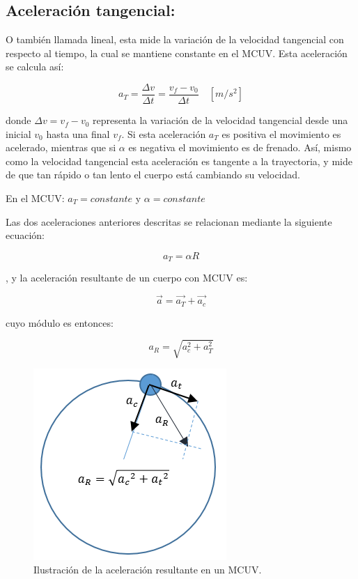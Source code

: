 \documentclass[a5paper,pagesize,10pt,bibtotoc,pointlessnumbers,
normalheadings,DIV=9,fleqn,x11names,table,twoside=false]{scrbook}
\begin{document}
\subsection{Aceleración tangencial:}

O también llamada lineal, esta mide la variación de la velocidad tangencial con respecto al tiempo, la cual se mantiene constante 
en el MCUV. Esta aceleración se calcula así:

\begin{equation}
a_T =\frac{\Delta v}{\Delta t} =\frac{v_f-v_0}{\Delta t}\quad [m/s^2]
\end{equation} 

donde $\Delta v = v_f-v_0$ representa la variación de la velocidad tangencial desde una inicial $v_0$ hasta una final $v_f$. Si 
esta aceleración $a_T$ es positiva el movimiento es acelerado, mientras que si $\alpha$ es negativa el movimiento es de frenado. 
Así, mismo como la velocidad tangencial esta aceleración es tangente a la trayectoria, y mide de que tan rápido o tan lento el 
cuerpo está cambiando su velocidad.

\begin{tcolorbox}
En el MCUV: $a_T = constante$ y $\alpha = constante$
\end{tcolorbox}

Las dos aceleraciones anteriores descritas se relacionan mediante la siguiente ecuación:

\begin{equation}
a_T = \alpha R
\end{equation} 

, y la aceleración resultante de un cuerpo con MCUV es:

\begin{equation}
\vec{a} = \vec{a_T}+\vec{a_c}
\end{equation}

cuyo módulo es entonces:

\begin{equation}
a_R =\sqrt{a_c^2+a_T^2} 
\end{equation}

\begin{figure}[ht]
 \centering
 \includegraphics[scale=0.5]{images/aceleracion-resultante.png}
 \caption{Ilustración de la aceleración resultante en un MCUV.}\label{ac}
\end{figure} 
 
\end{document}
